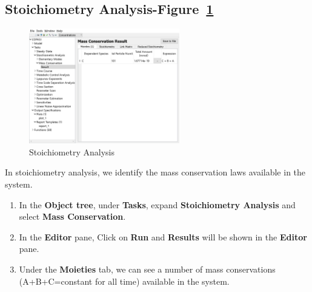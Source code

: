 \documentclass[10pt]{article}
\theoremstyle{definition}
\theoremstyle{remark}
\begin{document}
	\subsection*{Stoichiometry Analysis-Figure~\ref{13png}}
	\begin{figure}[!htb]
		\centering
		\includegraphics[height=5cm]{Images/13a.png}
		\caption{Stoichiometry Analysis}
		\label{13png}
	\end{figure}
	In stoichiometry analysis, we identify the mass conservation laws available in the system.
	\begin{enumerate}[start=1]\def\makelabel{\textbf{Step}~}
		\item In the \textbf{Object tree}, under \textbf{Tasks}, expand \textbf{Stoichiometry Analysis} and select \textbf{Mass Conservation}.
		\item In the \textbf{Editor} pane, Click on \textbf{Run} and \textbf{Results} will be shown in the \textbf{Editor} pane.
		\item Under the \textbf{Moieties} tab, we can see a number of mass conservations (A+B+C=constant for all time) available in the system.
	\end{enumerate}
	
	
	
	
	
	
	
	
	
\end{document}
